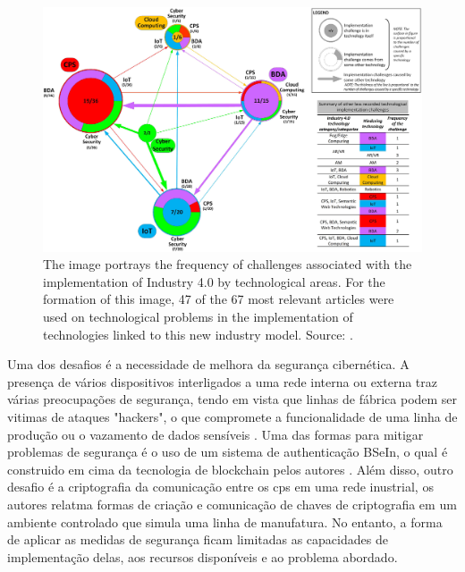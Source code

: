 \begin{figure}[h!]
    \centering
    \includegraphics[scale=0.95]{images/Related/chalanges.png}
    \caption{The image portrays the frequency of challenges associated with the implementation of Industry 4.0 by technological areas. For the formation of this image, 47 of the 67 most relevant articles were used on technological problems in the implementation of technologies linked to this new industry model. Source: \cite{Rikalovic2022}.}

    \label{fig:serp}
\end{figure}

Uma dos desafios é a necessidade de melhora da segurança cibernética. A presença de vários dispositivos interligados a uma rede interna ou externa traz várias preocupações de segurança, tendo em vista que linhas de fábrica podem ser vitimas de ataques "hackers", o que compromete a funcionalidade de uma linha de produção ou o vazamento de dados sensíveis \cite{Gilchrist2016}.  Uma das formas para mitigar problemas de segurança é o uso de um sistema de authenticação BSeIn, o qual é construido em cima da tecnologia de blockchain pelos autores \textcite{LIN201842}. Além disso, outro desafio é a criptografia da comunicação entre os \acrshort{cps} em uma rede inustrial, os autores \textcite{Kreiser2018} relatma formas de criação e comunicação de chaves de criptografia em um ambiente controlado que simula uma linha de manufatura. No entanto, a forma de aplicar as medidas de segurança ficam limitadas as capacidades de implementação delas, aos recursos disponíveis e ao problema abordado. 

